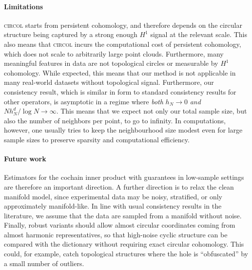 \documentclass[a4paper,11pt, DIV=10]{scrartcl}
\numberwithin{equation}{section}
\theoremstyle{definition}
\theoremstyle{remark}
\begin{document}
\paragraph{Limitations}
\textsc{circol} starts from persistent cohomology, and therefore depends on the circular structure being captured by a strong enough $H^1$ signal at the relevant scale.
This also means that \textsc{circol} incurs the computational cost of persistent cohomology, which does not scale to arbitrarily large point clouds.
Furthermore, many meaningful features in data are not topological circles or measurable by $H^1$ cohomology.
While expected, this means that our method is not applicable in many real-world datasets without topological signal.
Furthermore, our consistency result, which is similar in form to standard consistency results for other operators, is asymptotic in a regime where \emph{both} $h_N\to 0$ \emph{and} $N h_N^d/\log N\to\infty$.
This means that we expect not only our total sample size, but also the number of neighbors per point, to go to infinity.
In computations, however, one usually tries to keep the neighbourhood size modest even for large sample sizes to preserve sparsity and computational efficiency.
\paragraph{Future work}
Estimators for the cochain inner product with guarantees in low-sample settings are therefore an important direction.
A further direction is to relax the clean manifold model, since experimental data may be noisy, stratified, or only approximately manifold-like.
In line with usual consistency results in the literature, we assume that the data are sampled from a manifold without noise.
Finally, robust variants should allow almost circular coordinates coming from almost harmonic representatives, so that high-noise cyclic structure can be compared with the dictionary without requiring exact circular cohomology.
This could, for example, catch topological structures where the hole is \enquote{obfuscated} by a small number of outliers.


%
\end{document}
